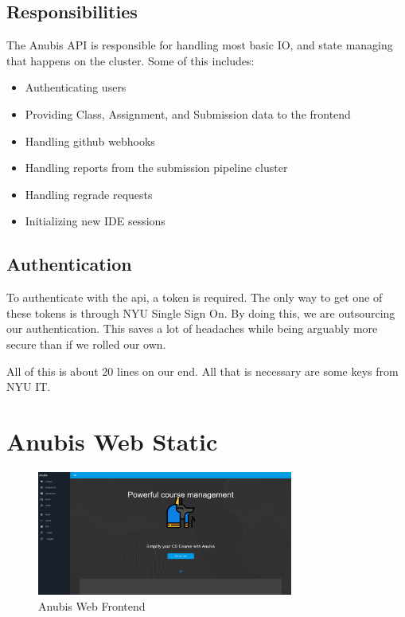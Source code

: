 \subsection{Responsibilities}\label{subsec:api-responsibilities}

The Anubis API is responsible for handling most basic
IO, and state managing that happens on the cluster.
Some of this includes:

\begin{itemize}
    \item Authenticating users
    \item Providing Class, Assignment, and Submission data to the frontend
    \item Handling github webhooks
    \item Handling reports from the submission pipeline cluster
    \item Handling regrade requests
    \item Initializing new IDE sessions
\end{itemize}

\subsection{Authentication}\label{subsec:api-authentication}

To authenticate with the api, a token is required.
The only way to get one of these tokens is through NYU Single Sign On.
By doing this, we are outsourcing our authentication.
This saves a lot of headaches while being arguably more secure than if we rolled our own.

All of this is about 20 lines on our end.
All that is necessary are some keys from NYU IT.


\section{Anubis Web Static}\label{sec:web}

\begin{figure}[ht]
    \centering
    \includegraphics[width=0.75\textwidth]{figures/anubis-frontend}
    \caption{Anubis Web Frontend\label{fig:web-frontend}}
\end{figure}


